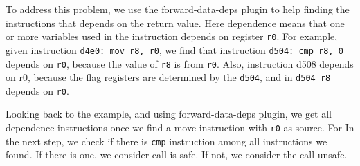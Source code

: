 To address this problem, we use the forward-data-deps plugin to help finding the
instructions that depends on the return value. Here dependence means that one or
more variables used in the instruction depends on register \texttt{r0}. For
example, given instruction \texttt{d4e0: mov r8, r0}, we find that instruction
\texttt{d504: cmp r8, 0} depends on \texttt{r0}, because the value of
\texttt{r8} is from \texttt{r0}. Also, instruction d508 depends on r0, because
the flag registers are determined by
the \texttt{d504}, and in \texttt{d504 r8} depends on \texttt{r0}.

Looking back to the example, and using forward-data-deps plugin, we get all
dependence instructions once we find a move instruction with \texttt{r0} as
source. For In the next step, we check if there is \texttt{cmp} instruction
among all instructions we found. If there is one, we consider call is safe. If
not, we consider the call unsafe.
